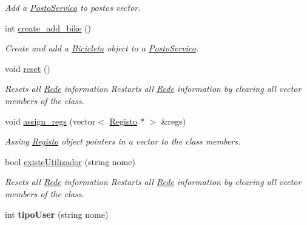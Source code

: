 \begin{DoxyCompactItemize}
\begin{DoxyCompactList}\small\item\em Add a \hyperlink{class_posto_servico}{Posto\+Servico} to postos vector. \end{DoxyCompactList}\item 
int \hyperlink{class_rede_a4177da39d4aa05cd0451d52a7220b7c5}{create\+\_\+add\+\_\+bike} ()
\begin{DoxyCompactList}\small\item\em Create and add a \hyperlink{class_bicicleta}{Bicicleta} object to a \hyperlink{class_posto_servico}{Posto\+Servico}. \end{DoxyCompactList}\item 
\hypertarget{class_rede_adec8c4515163174c0fab8068e36c6cc5}{void \hyperlink{class_rede_adec8c4515163174c0fab8068e36c6cc5}{reset} ()}\label{class_rede_adec8c4515163174c0fab8068e36c6cc5}

\begin{DoxyCompactList}\small\item\em Resets all \hyperlink{class_rede}{Rede} information Restarts all \hyperlink{class_rede}{Rede} information by clearing all vector members of the class. \end{DoxyCompactList}\item 
void \hyperlink{class_rede_ad38e26e59622727f978b995f6b9955c5}{assign\+\_\+regs} (vector$<$ \hyperlink{class_registo}{Registo} $\ast$ $>$ \&regs)
\begin{DoxyCompactList}\small\item\em Assing \hyperlink{class_registo}{Registo} object pointers in a vector to the class members. \end{DoxyCompactList}\item 
\hypertarget{class_rede_a42b5a88380e63b78e5c99894aee0dfbc}{bool \hyperlink{class_rede_a42b5a88380e63b78e5c99894aee0dfbc}{existe\+Utilizador} (string nome)}\label{class_rede_a42b5a88380e63b78e5c99894aee0dfbc}

\begin{DoxyCompactList}\small\item\em Resets all \hyperlink{class_rede}{Rede} information Restarts all \hyperlink{class_rede}{Rede} information by clearing all vector members of the class. \end{DoxyCompactList}\item 
\hypertarget{class_rede_ac74ae338ed2ddb5b8f94c9ed33e172ef}{int {\bfseries tipo\+User} (string nome)}\label{class_rede_ac74ae338ed2ddb5b8f94c9ed33e172ef}


\end{DoxyCompactItemize}
